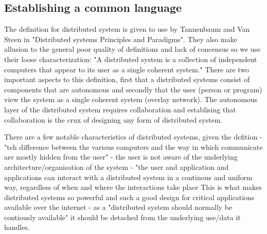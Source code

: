 \documentclass[a4paper]{article}
\begin{document}
\subsection{Establishing a common language}\label{subsec:establishing-a-common-language}
The definition for distributed system is given to use by Tannenbaum and Van Steen in "Distributed systems Principles and Paradigms". They also make allusion to the general poor quality of definitions and lack of concensus so we use their loose characterization: "A distributed system is a collection of independent computers that appear to its user as a single coherent system."
There are two important aspects to this definition, first that a distributed systems consist of components that are autonomous and secondly that the user (person or program) view the system as a single coherent system (overlay network). The autonomous layer of the distributed system requires collaboration and establising that collaboration is the crux of designing any form of distributed system.

There are a few notable characteristics of distributed systems, given the defition
- "teh difference between the various computers and the way in which communicate are mostly hidden from the user"
- the user is not aware of the underlying architecture/organisation of the system
- "the user and application and applications can interact with a distributed system in a continous and uniform way, regardless of when and where the interactions take place
This is what makes distributed systems so powerful and such a good design for critical applications available over the internet - as a "distributed system should normally be contiously available" it should be detached from the underlying use/data it handles.
\end{document}
